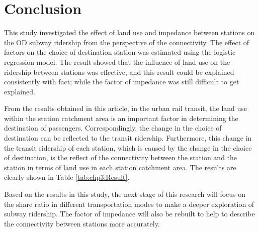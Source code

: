 %
\section{Conclusion}
%
This study investigated the effect of land use and impedance between stations on the OD subway ridership from the perspective of the connectivity. The effect of factors on the choice of destination station was estimated using the logistic regression model. The result showed that the influence of land use on the ridership between stations was effective, and this result could be explained consistently with fact; while the factor of impedance was still difficult to get explained.

%
From the results obtained in this article, in the urban rail transit, the land use within the station catchment area is an important factor in determining the destination of passengers. Correspondingly, the change in the choice of destination can be reflected to the transit ridership. Furthermore, this change in the transit ridership of each station, which is caused by the change in the choice of destination, is the reflect of the connectivity between the station and the station in terms of land use in each station catchment area. The results are clearly shown in Table \ref{tab:chp3:Result}.

%
Based on the results in this study, the next stage of this research will focus on the share ratio in different transportation modes to make a deeper exploration of subway ridership. The factor of impedance will also be rebuilt to help to describe the connectivity between stations more accurately.

\clearpage %

% 
